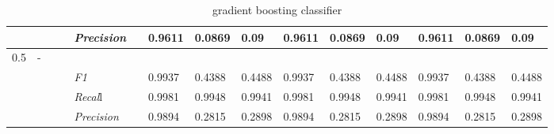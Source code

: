 \begin{table}[]
\begin{tabularx}{\textwidth}{XXlllllllllllll@{}}
                                                                    &                                                                     &                                                           &    & \textit{Precision} &                                                      & 0.9611 & 0.0869 & 0.09 & 0.9611 & 0.0869 & 0.09 & 0.9611 & 0.0869 & 0.09 \\ \midrule
0.5 & - &  &  &                                                              &                                                                   &                                                             &                                                               &                                                                    &                                                              &                                                               &                                                                    &                                                              \\
                                                                    &                                                                     &                                                           &    & \textit{F1} &                                                      & 0.9937        & 0.4388        & 0.4488        & 0.9937        & 0.4388        & 0.4488        & 0.9937        & 0.4388        & 0.4488        \\
                                                                    &                                                                     &                                                           &    & \textit{Recal}l &                                                      & 0.9981    & 0.9948    & 0.9941    & 0.9981    & 0.9948    & 0.9941    & 0.9981    & 0.9948    & 0.9941    \\
                                                                    &                                                                     &                                                           &    & \textit{Precision} &                                                      & 0.9894 & 0.2815 & 0.2898 & 0.9894 & 0.2815 & 0.2898 & 0.9894 & 0.2815 & 0.2898 \\ \midrule
\end{tabularx}
\caption{gradient boosting classifier}
\label{tab:all_results_gradient_boosting_classifier}
\end{table}


